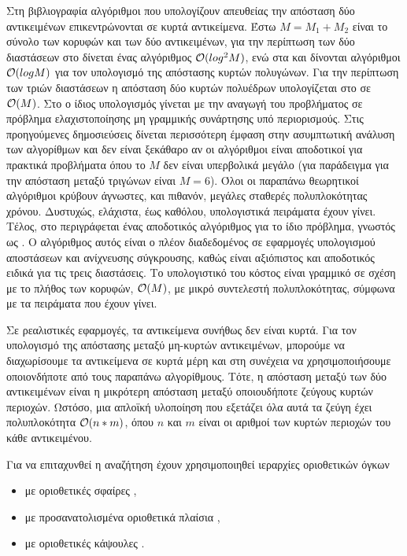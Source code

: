 Στη βιβλιογραφία αλγόριθμοι που υπολογίζουν απευθείας την απόσταση δύο αντικειμένων 
επικεντρώνονται σε κυρτά αντικείμενα.
Έστω $M = M_1 + M_2$ είναι το σύνολο των κορυφών και των δύο 
αντικειμένων,
για την περίπτωση των δύο διαστάσεων στο 
\cite{schwartz1981finding} δίνεται ένας αλγόριθμος $\mathcal{O}(log^2M)$, 
ενώ στα \cite{edelsbrunner1985computing} 
και \cite{chin1983optimal} δίνονται αλγόριθμοι $\mathcal{O}(logM)$ 
για τον υπολογισμό της απόστασης κυρτών πολυγώνων.
Για την περίπτωση των τριών διαστάσεων η απόσταση δύο κυρτών πολυέδρων 
υπολογίζεται στο \cite{dobkin1985linear} σε $\mathcal{O}(M)$.
Στο \cite{bobrow1989direct} ο ίδιος υπολογισμός γίνεται με την
αναγωγή του προβλήματος σε πρόβλημα ελαχιστοποίησης 
μη γραμμικής συνάρτησης υπό περιορισμούς.
Στις προηγούμενες δημοσιεύσεις δίνεται περισσότερη έμφαση 
στην ασυμπτωτική ανάλυση των αλγορίθμων και δεν είναι ξεκάθαρο 
αν οι αλγόριθμοι είναι αποδοτικοί για πρακτικά προβλήματα όπου το 
$M$ δεν είναι υπερβολικά μεγάλο (για παράδειγμα για την απόσταση 
μεταξύ τριγώνων είναι $M = 6$).
Όλοι οι παραπάνω θεωρητικοί αλγόριθμοι κρύβουν άγνωστες, και πιθανόν, 
μεγάλες σταθερές πολυπλοκότητας χρόνου. 
Δυστυχώς, ελάχιστα, έως καθόλου, υπολογιστικά πειράματα έχουν γίνει.
Τέλος, στο \cite{gilbert1988fast} περιγράφεται ένας αποδοτικός αλγόριθμος 
για το ίδιο πρόβλημα, γνωστός ως .
Ο αλγόριθμος αυτός είναι ο πλέον διαδεδομένος σε εφαρμογές 
υπολογισμού αποστάσεων και ανίχνευσης σύγκρουσης, καθώς είναι αξιόπιστος 
και αποδοτικός ειδικά για τις τρεις διαστάσεις.
Το υπολογιστικό του κόστος είναι γραμμικό σε σχέση με το πλήθος των κορυφών,
$\mathcal{O}(M)$, με μικρό συντελεστή πολυπλοκότητας, σύμφωνα με τα πειράματα που 
έχουν γίνει. 

Σε ρεαλιστικές εφαρμογές, τα αντικείμενα συνήθως δεν είναι κυρτά.
Για τον υπολογισμό της απόστασης μεταξύ μη-κυρτών αντικειμένων, 
μπορούμε να διαχωρίσουμε τα αντικείμενα σε κυρτά μέρη και 
στη συνέχεια να χρησιμοποιήσουμε οποιονδήποτε από τους παραπάνω
αλγορίθμους.
Τότε, η απόσταση μεταξύ των δύο αντικειμένων είναι η μικρότερη απόσταση 
μεταξύ οποιουδήποτε ζεύγους κυρτών περιοχών. 
Ωστόσο, μια απλοϊκή υλοποίηση που εξετάζει όλα αυτά τα ζεύγη έχει 
πολυπλοκότητα $\mathcal{O}(n*m)$, όπου $n$ και $m$ είναι οι αριθμοί των 
κυρτών περιοχών του κάθε αντικειμένου.

Για να επιταχυνθεί η αναζήτηση έχουν χρησιμοποιηθεί ιεραρχίες οριοθετικών όγκων
\begin{itemize}
    \item με οριοθετικές σφαίρες \cite{quinlan1994efficient},
    \item με προσανατολισμένα οριοθετικά πλαίσια \cite{johnson1998framework},
    \item με οριοθετικές κάψουλες \cite{larsen1999fast}.
\end{itemize}

